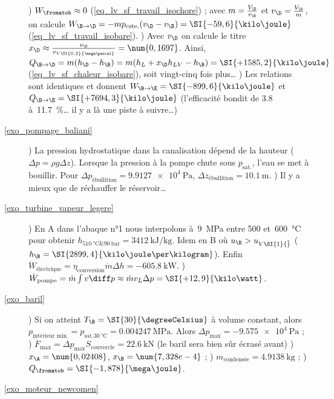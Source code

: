 \begin{description}
			) $W_\fromatob \approx 0$ (\ref{eq_lv_sf_travail_isochore}) ; avec $m = \frac{V_\B}{v_\B}$ et $v_\D = \frac{V_\D}{m}$, on calcule $W_{\B \to \D} = - m p_\text{cste.} (v_\D - v_\B) = \SI{-59,6}{\kilo\joule}$ (\ref{eq_lv_sf_travail_isobare}).
			) Avec $v_\D$ on calcule le titre $x_\D \approx \frac{v_\D}{v_{V \SI{0,2}{\mega\pascal}}} = \num{0,1697}$.
				Ainsi, ${Q}_{\B \to \D} = m (h_\D - h_\B) = m (h_L + x_\D h_{LV} - h_\B) = \SI{+1585,2}{\kilo\joule}$ (\ref{eq_lv_sf_chaleur_isobare}), soit vingt-cinq fois plus…
			) Les relations sont identiques et donnent ${W}_{\B \to \E} = \SI{-899,6}{\kilo\joule}$ et ${Q}_{\B \to \E} = \SI{+7694,3}{\kilo\joule}$ (l’efficacité bondit de \num{3,8} à~\SI{11,7}{\percent}… il y a là une piste à suivre…)
	\item [\ref{exo_pompage_baliani}]
			) La pression hydrostatique dans la canalisation dépend de la hauteur ($\Delta p = \rho g \Delta z$). Lorsque la pression à la pompe chute sous $p_\text{sat.}$, l’eau se met à bouillir. Pour $\Delta p_\text{ébullition} = \SI{9,9127e4}{\pascal}$, $\Delta z_\text{ébullition} = \SI{10,1}{\metre}$.
			) Il y a mieux que de réchauffer le réservoir…
	\item [\ref{exo_turbine_vapeur_legere}]
			) En A dans l’abaque n°1 nous interpolons à~\SI{9}{\mega\pascal} entre \num{500} et~\SI{600}{\degreeCelsius} pour obtenir $h_{\SI{510}{\degreeCelsius} \& \SI{90}{\bar}} = \SI{3412}{\kilo\joule\per\kilogram}$.
				Idem en B où $u_\B > u_{V \SI{1}{\bar}}$ ($h_\B = \SI{2899,4}{\kilo\joule\per\kilogram}$).
				Enfin $\dot{W}_\text{électrique} = \eta_\text{conversion} \dot m \Delta h = \SI{-605,8}{\kilo\watt}$.
			) $\dot{W}_\text{pompe} = \dot m \int v \diff p \approx \dot m v_L \Delta p = \SI{+12,9}{\kilo\watt}$.
	\item [\ref{exo_baril}]
			) Si on atteint $T_\B = \SI{30}{\degreeCelsius}$ à volume constant, alors $p_\text{intérieur min.} = p_{\text{sat.} \SI{30}{\degreeCelsius}} = \SI{0,004247}{\mega\pascal}$. Alors $\Delta p_\text{max} = \SI{-9,575e4}{\pascal}$ ;
					\tab{}) $F_\text{max} = \Delta p_\text{max} S_\text{couvercle} = \SI{22,6}{\kilo\newton}$ (le baril sera bien sûr écrasé avant)
					) $x_\A = \num{0,02408}$, $x_\B = \num{7,328e-4}$ ;
					) $m_\text{condensée} = \SI{4,9138}{\kilogram}$ ;
					) ${Q}_\fromatob = \SI{-1,878}{\mega\joule}$.
	\item [\ref{exo_moteur_newcomen}]

\end{description}
